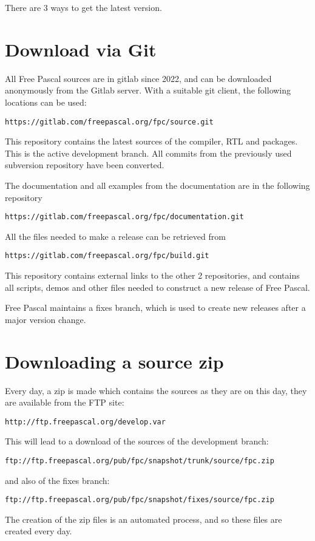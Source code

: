 There are 3 ways to get the latest version.

\section{Download via Git}
All Free Pascal sources are in gitlab since 2022, and can be downloaded anonymously
from the Gitlab server. With a suitable git client, the following
locations can be used:
\begin{verbatim}
https://gitlab.com/freepascal.org/fpc/source.git
\end{verbatim}
This repository contains the latest sources of the compiler, RTL and packages.
This is the active development branch. All commits from the previously used subversion
repository have been converted.

The documentation and all examples from the documentation are in the
following repository
\begin{verbatim}
https://gitlab.com/freepascal.org/fpc/documentation.git
\end{verbatim}

All the files needed to make a release can be retrieved from
\begin{verbatim}
https://gitlab.com/freepascal.org/fpc/build.git
\end{verbatim}
This repository contains external links to the other 2 repositories, and
contains all scripts, demos and other files needed to construct a new
release of Free Pascal.

Free Pascal maintains a fixes branch, which is used to create new releases
after a major version change. 

\section{Downloading a source zip}
Every day, a zip is made which contains the sources as they are on this day,
they are available from the FTP site:
\begin{verbatim}
http://ftp.freepascal.org/develop.var
\end{verbatim}
This will lead to a download of the sources of the development branch:
\begin{verbatim}
ftp://ftp.freepascal.org/pub/fpc/snapshot/trunk/source/fpc.zip
\end{verbatim}
and also of the fixes branch:
\begin{verbatim}
ftp://ftp.freepascal.org/pub/fpc/snapshot/fixes/source/fpc.zip
\end{verbatim}
The creation of the zip files is an automated process, and so these files
are created every day.

